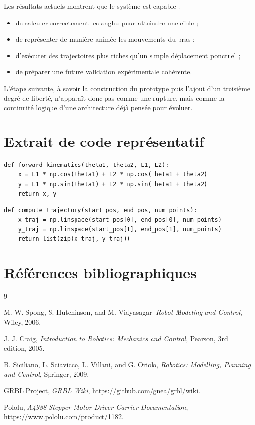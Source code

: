 \documentclass[12pt,a4paper]{report}
\begin{document}
Les résultats actuels montrent que le système est capable :

\begin{itemize}
    \item de calculer correctement les angles pour atteindre une cible ;
    \item de représenter de manière animée les mouvements du bras ;
    \item d'exécuter des trajectoires plus riches qu'un simple déplacement ponctuel ;
    \item de préparer une future validation expérimentale cohérente.
\end{itemize}

L'étape suivante, à savoir la construction du prototype puis l'ajout d'un troisième
degré de liberté, n'apparaît donc pas comme une rupture, mais comme la continuité
logique d'une architecture déjà pensée pour évoluer.

\appendix

\chapter{Extrait de code représentatif}

\begin{lstlisting}[style=pythonstyle,caption={Exemple simplifié de cinématique directe}]
def forward_kinematics(theta1, theta2, L1, L2):
    x = L1 * np.cos(theta1) + L2 * np.cos(theta1 + theta2)
    y = L1 * np.sin(theta1) + L2 * np.sin(theta1 + theta2)
    return x, y
\end{lstlisting}

\begin{lstlisting}[style=pythonstyle,caption={Exemple simplifié d'interpolation cartésienne}]
def compute_trajectory(start_pos, end_pos, num_points):
    x_traj = np.linspace(start_pos[0], end_pos[0], num_points)
    y_traj = np.linspace(start_pos[1], end_pos[1], num_points)
    return list(zip(x_traj, y_traj))
\end{lstlisting}

\chapter{Références bibliographiques}

\begin{thebibliography}{9}

M. W. Spong, S. Hutchinson, and M. Vidyasagar,
\textit{Robot Modeling and Control},
Wiley, 2006.

J. J. Craig,
\textit{Introduction to Robotics: Mechanics and Control},
Pearson, 3rd edition, 2005.

B. Siciliano, L. Sciavicco, L. Villani, and G. Oriolo,
\textit{Robotics: Modelling, Planning and Control},
Springer, 2009.

GRBL Project,
\textit{GRBL Wiki},
\url{https://github.com/gnea/grbl/wiki}.

Pololu,
\textit{A4988 Stepper Motor Driver Carrier Documentation},
\url{https://www.pololu.com/product/1182}.

\end{thebibliography}
\end{document}
